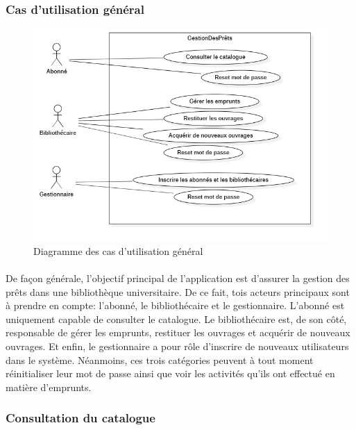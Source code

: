 \subsubsection{Cas d'utilisation général} 
\begin{figure}[h]
        \centering
        \includegraphics[width=1\textwidth]{generalUseCase}
        \caption{Diagramme des cas d'utilisation général}
        \label{image-generalUseCase}
        \end{figure}
\paragraph{}
De façon générale, l'objectif principal de l'application est d'assurer la 
gestion des prêts dans une bibliothèque universitaire. De ce fait, tois 
acteurs principaux sont à prendre en compte: l'abonné, le bibliothécaire et 
le gestionnaire. L'abonné est uniquement capable de consulter le catalogue.
Le bibliothécaire est, de son côté, responsable de gérer les emprunts, restituer les ouvrages et 
acquérir de nouveaux ouvrages. Et enfin, le gestionnaire a pour rôle d'inscrire de nouveaux utilisateurs
dans le système. Néanmoins, ces trois catégories peuvent à tout moment réinitialiser leur mot de passe ainsi 
que voir les activités qu'ils ont effectué en matière d'emprunts.

\subsubsection{Consultation du catalogue} 
